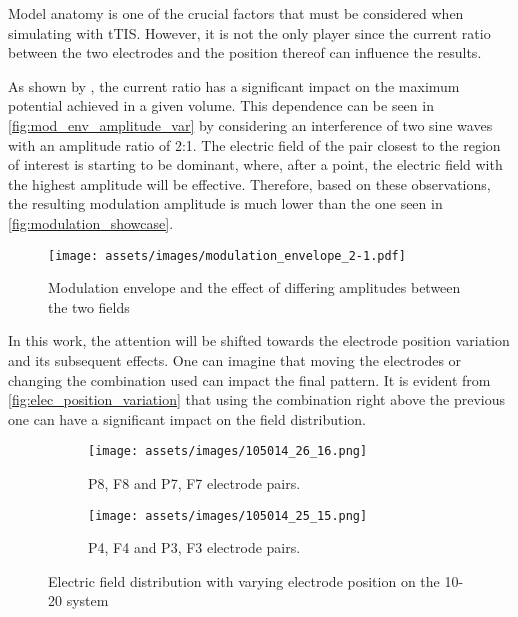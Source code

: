 Model anatomy is one of the crucial factors that must be considered when simulating with \gls{tTIS}. However, it is not the only player since the current ratio between the two electrodes and the position thereof can influence the results.

As shown by , the current ratio has a significant impact on the maximum potential achieved in a given volume. This dependence can be seen in \autoref{fig:mod_env_amplitude_var} by considering an interference of two sine waves with an amplitude ratio of 2:1. The electric field of the pair closest to the region of interest is starting to be dominant, where, after a point, the electric field with the highest amplitude will be effective. Therefore, based on these observations, the resulting modulation amplitude is much lower than the one seen in \autoref{fig:modulation_showcase}.
\begin{figure}[H]
    \centering
    \texttt{[image: assets/images/modulation\_envelope\_2-1.pdf]}
    \caption{Modulation envelope and the effect of differing amplitudes between the two fields}
    \label{fig:mod_env_amplitude_var}
\end{figure}
In this work, the attention will be shifted towards the electrode position variation and its subsequent effects. One can imagine that moving the electrodes or changing the combination used can impact the final pattern. It is evident from \autoref{fig:elec_position_variation} that using the combination right above the previous one can have a significant impact on the field distribution.
\begin{figure}[H]
    \centering
    \begin{subfigure}[b]{0.49\textwidth}
        \texttt{[image: assets/images/105014\_26\_16.png]}
        \caption{P8, F8 and P7, F7 electrode pairs.}
        \label{fig:26_16_elec_pair}
    \end{subfigure}
    \begin{subfigure}[b]{0.49\textwidth}
        \texttt{[image: assets/images/105014\_25\_15.png]}
        \caption{P4, F4 and P3, F3 electrode pairs.}
        \label{fig:25_15_elec_pair}
    \end{subfigure}
    \caption{Electric field distribution with varying electrode position on the 10-20 system}
    \label{fig:elec_position_variation}
\end{figure}

